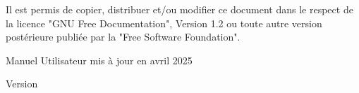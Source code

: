 {\begin{titlepage}
\begin{flushleft}
    Il est permis de copier, distribuer et/ou modifier ce document dans le respect de la licence "GNU Free Documentation", Version 1.2 ou toute autre version postérieure publiée par la "Free Software Foundation".

    Manuel Utilisateur mis à jour en avril 2025
    \end{flushleft}
    \end{titlepage}
    \pagestyle{headings}
}{%
    \begin{titlepage}
        \large{Version \DocVersion}
    \end{titlepage}
    \clearemptydoublepage \pagestyle{headings}
    \clearemptydoublepage {}
}
\makeatother
